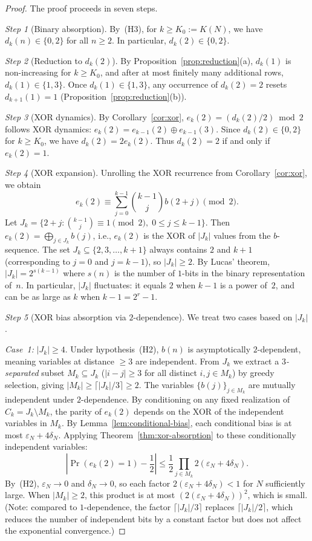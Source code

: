 \documentclass[11pt, a4paper]{amsart}
\theoremstyle{plain}
\theoremstyle{definition}
\renewcommand{\Pr}{\operatorname{Pr}}
\begin{document}
\begin{proof}
The proof proceeds in seven steps.

\textit{Step 1} (Binary absorption). By~(H3), for $k \ge K_0 := K(N)$, we have $d_k(n) \in \{0, 2\}$ for all $n \ge 2$. 
In particular, $d_k(2) \in \{0, 2\}$.

\textit{Step 2} (Reduction to $d_k(2)$). By Proposition~\ref{prop:reduction}(a), $d_k(1)$ is non-increasing for $k \ge K_0$, 
and after at most finitely many additional rows, $d_k(1) \in \{1, 3\}$. Once $d_k(1) \in \{1, 3\}$, any occurrence of $d_k(2) = 2$ 
resets $d_{k+1}(1) = 1$ (Proposition~\ref{prop:reduction}(b)).

\textit{Step 3} (XOR dynamics). By Corollary~\ref{cor:xor}, $e_k(2) = (d_k(2)/2) \bmod 2$ follows XOR dynamics: $e_k(2) = e_{k-1}(2) \oplus e_{k-1}(3)$. 
Since $d_k(2) \in \{0, 2\}$ for $k \ge K_0$, we have $d_k(2) = 2 e_k(2)$. Thus $d_k(2) = 2$ if and only if $e_k(2) = 1$.

\textit{Step 4} (XOR expansion). Unrolling the XOR recurrence from Corollary~\ref{cor:xor}, we obtain
\[
e_k(2) \equiv \sum_{j=0}^{k-1} \binom{k-1}{j} b(2+j) \pmod{2}.
\]
Let $J_k = \{2+j : \binom{k-1}{j} \equiv 1 \pmod{2},\; 0 \le j \le k-1\}$. Then $e_k(2) = \bigoplus_{j \in J_k} b(j)$, i.e., $e_k(2)$ 
is the XOR of $|J_k|$ values from the $b$-sequence. The set $J_k \subseteq \{2, 3, \ldots, k+1\}$ always contains $2$ 
and $k+1$ (corresponding to $j=0$ and $j=k-1$), so $|J_k| \ge 2$. By Lucas' theorem, $|J_k| = 2^{s(k-1)}$ where $s(n)$ is the number of $1$-bits in the binary representation of~$n$. In particular, $|J_k|$ fluctuates: it equals $2$ when $k-1$ is a power of~$2$, and can be as large as $k$ when $k-1 = 2^r - 1$.

\textit{Step 5} (XOR bias absorption via $2$-dependence). We treat two cases based on $|J_k|$.

\textit{Case~1:} $|J_k| \ge 4$. Under hypothesis~(H2), $b(n)$ is asymptotically $2$-dependent, meaning variables at distance $\ge 3$
are independent. From $J_k$ we extract a \emph{$3$-separated} subset $M_k \subseteq J_k$ ($|i - j| \ge 3$ for all distinct $i, j \in M_k$)
by greedy selection, giving $|M_k| \ge \lceil |J_k|/3 \rceil \ge 2$. The variables $\{b(j)\}_{j \in M_k}$ are mutually independent
under $2$-dependence. By conditioning on any fixed realization of $C_k = J_k \setminus M_k$, the parity of $e_k(2)$ depends on the XOR
of the independent variables in $M_k$. By Lemma~\ref{lem:conditional-bias}, each conditional bias is at most $\varepsilon_N + 4\delta_N$.
Applying Theorem~\ref{thm:xor-absorption} to these conditionally independent variables:
\[
\left|\Pr(e_k(2) = 1) - \frac{1}{2}\right| \le \frac{1}{2}\prod_{j \in M_k} 2(\varepsilon_N + 4\delta_N).
\]
By~(H2), $\varepsilon_N \to 0$ and $\delta_N \to 0$, so each factor $2(\varepsilon_N + 4\delta_N) < 1$ for $N$ sufficiently large. When $|M_k| \ge 2$,
this product is at most $(2(\varepsilon_N + 4\delta_N))^2$, which is small. (Note: compared to $1$-dependence, the factor $\lceil |J_k|/3 \rceil$ replaces
$\lceil |J_k|/2 \rceil$, which reduces the number of independent bits by a constant factor but does not affect the exponential convergence.)


\end{proof}
\end{document}
